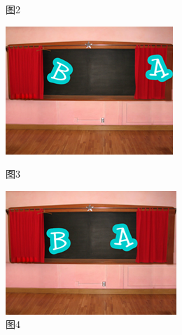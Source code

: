 \documentclass[10pt, a4paper]{article}
\begin{document}
\begin{enumerate}
\begin{figure}[htbp]
\begin{minipage}[t]{.18\textwidth}
                \caption*{图2}
            \end{minipage}
            \begin{minipage}[t]{.18\textwidth}
                \centering
                \includegraphics[width=\textwidth]{37-3.png}
                \caption*{图3}
            \end{minipage}
            \begin{minipage}[t]{.18\textwidth}
                \includegraphics[width=\textwidth]{37-4.png}
                \caption*{图4}
            \end{minipage}
            \begin{minipage}[t]{.18\textwidth}
                \centering

\end{minipage}
\end{figure}
\end{enumerate}
\end{document}
